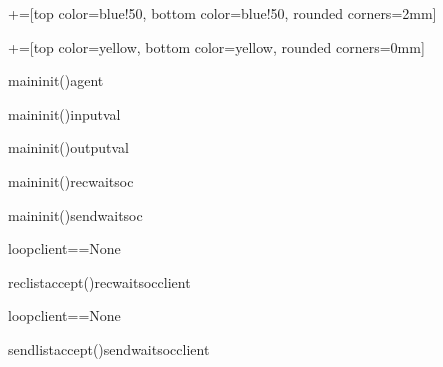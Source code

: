 \begin{sequencediagram}[1]
	+=[top color=blue!50, bottom color=blue!50, rounded corners=2mm]
	
	+=[top color=yellow, bottom color=yellow, rounded corners=0mm] 
	
	
	\begin{messcall}{main}{init()}{agent}{}		
	\end{messcall}		
	\begin{messcall}{main}{init()}{inputval}
	\end{messcall}	
	\begin{messcall}{main}{init()}{outputval}{}		
	\end{messcall}
	\begin{messcall}{main}{init()}{recwaitsoc}{}		
	\end{messcall}		
	\begin{messcall}{main}{init()}{sendwaitsoc}{}		
	\end{messcall}		
	\begin{sdblock}{loop}{client==None}
		\begin{call}[2]{reclist}{accept()}{recwaitsoc}{client}
		\end{call}
	\end{sdblock}
	\prelevel\prelevel\prelevel\prelevel
	
	\prelevel\prelevel\prelevel\prelevel
	\begin{sdblock}{loop}{client==None}
		\begin{call}[2]{sendlist}{accept()}{sendwaitsoc}{client}
		\end{call}
	\end{sdblock}
	\prelevel\prelevel\prelevel\prelevel
	\postlevel\postlevel
	

\end{sequencediagram}
